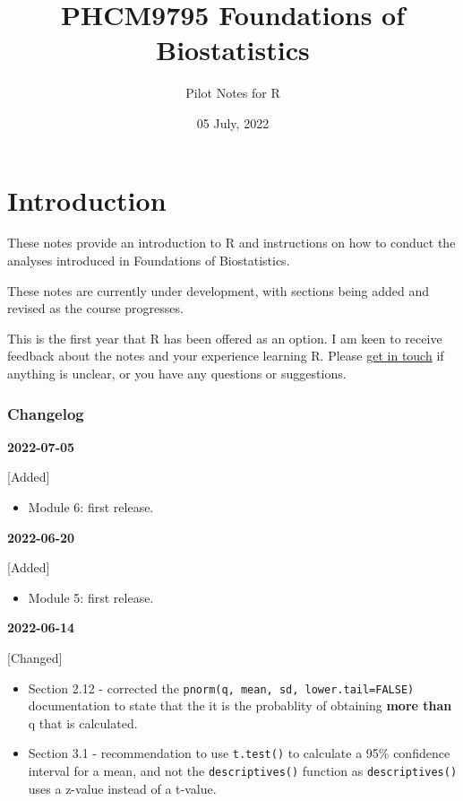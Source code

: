 \documentclass[
]{memoir}
\title{PHCM9795 Foundations of Biostatistics}
\author{Pilot Notes for R}
\date{05 July, 2022}
\providecommand{\tightlist}{%
  \setlength{\itemsep}{0pt}\setlength{\parskip}{0pt}}
\begin{document}
\maketitle

{
\setcounter{tocdepth}{1}
\tableofcontents
}
\hypertarget{introduction}{%
\chapter*{Introduction}\label{introduction}}

These notes provide an introduction to R and instructions on how to conduct the analyses introduced in Foundations of Biostatistics.

These notes are currently under development, with sections being added and revised as the course progresses.

This is the first year that R has been offered as an option. I am keen to receive feedback about the notes and your experience learning R. Please \href{mailto:t.dobbins@unsw.edu.au}{get in touch} if anything is unclear, or you have any questions or suggestions.

\hypertarget{changelog}{%
\subsection*{Changelog}\label{changelog}}

\textbf{2022-07-05}

{[}Added{]}

\begin{itemize}
\tightlist
\item
  Module 6: first release.
\end{itemize}

\textbf{2022-06-20}

{[}Added{]}

\begin{itemize}
\tightlist
\item
  Module 5: first release.
\end{itemize}

\textbf{2022-06-14}

{[}Changed{]}

\begin{itemize}
\item
  Section 2.12 - corrected the \texttt{pnorm(q,\ mean,\ sd,\ lower.tail=FALSE)} documentation to state that the it is the probablity of obtaining \textbf{more than} q that is calculated.
\item
  Section 3.1 - recommendation to use \texttt{t.test()} to calculate a 95\% confidence interval for a mean, and not the \texttt{descriptives()} function as \texttt{descriptives()} uses a z-value instead of a t-value.
\end{itemize}
\end{document}
